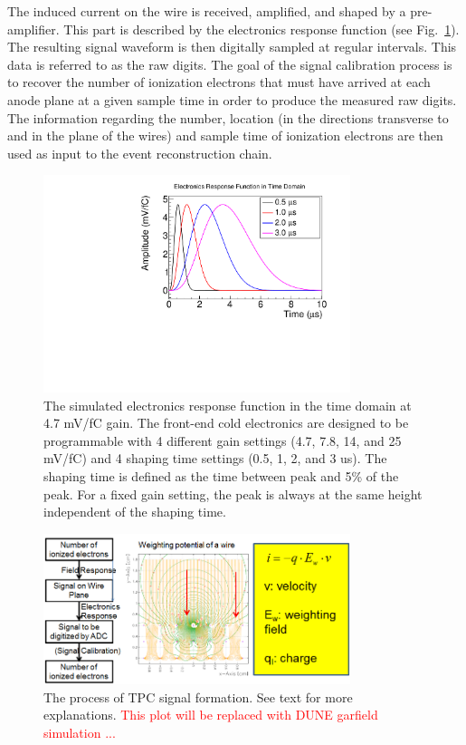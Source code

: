 The induced current on the wire is received, amplified, and shaped by
a pre-amplifier. This part is described by the electronics response
function (see Fig.~\ref{fig:ele_res}).  
The resulting signal waveform is then digitally sampled at
regular intervals.  This data is referred to as the raw digits.  The
goal of the signal calibration process is to recover the number of
ionization electrons that must have arrived at each anode plane at a
given sample time in order to produce the measured raw digits.  The
information regarding the number, location (in the directions transverse
to and in the plane of the wires) and sample time of ionization
electrons are then used as input to the event reconstruction chain.

\begin{figure}[htb]
\centering
\includegraphics[width=0.8\textwidth]{figures/electronics_res.pdf}
\caption{The simulated electronics response function in the time domain at 4.7 mV/fC gain. 
The front-end cold electronics are designed to be programmable with 4 different 
gain settings (4.7, 7.8, 14, and 25 mV/fC) and 4 shaping time settings 
(0.5, 1, 2, and 3 us). The shaping time is defined as the time 
between peak and 5\% of the peak. For a fixed gain setting, the peak 
is always at the same height independent of the shaping time. }
\label{fig:ele_res}
\end{figure}



\begin{figure}[htb]
\centering
\includegraphics[width=0.8\textwidth]{figures/Signal_formation.png}
\caption{The process of TPC signal formation. See text for more explanations.
\textcolor{red}{This plot will be replaced with DUNE garfield simulation ...}}
\label{fig:signal_formation}
\end{figure}

